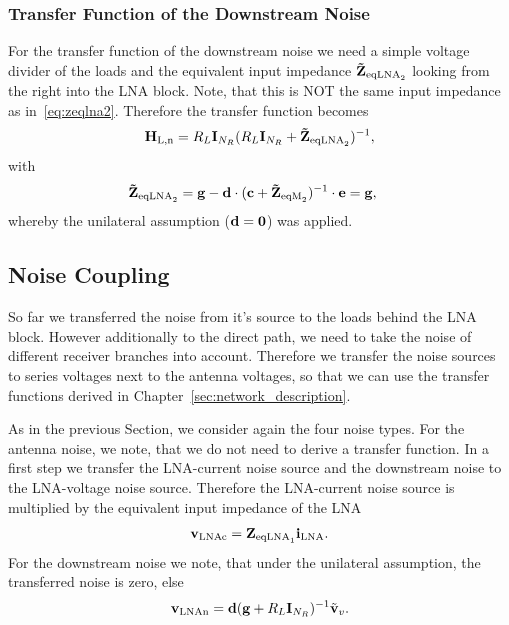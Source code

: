 \subsubsection{Transfer Function of the Downstream Noise}
\label{sec:down_noise_transf}
For the transfer function of the downstream noise we need a simple voltage divider of the loads and the equivalent input impedance $\mathbf{\tilde{Z}}_{\text{eqLNA}_2}$ looking from the right into the LNA block.
Note, that this is NOT the same input impedance as in~\eqref{eq:zeqlna2}.
Therefore the transfer function becomes
\begin{equation}
\mathbf{H}_\text{L,n} = R_L\mathbf{I}_{N_R}(R_L\mathbf{I}_{N_R} + \mathbf{\tilde{Z}}_{\text{eqLNA}_2})^{-1},
\end{equation}
with 
\begin{align}
\label{eq:zeqlna2_down}
\mathbf{\tilde{Z}}_{\text{eqLNA}_2} &= \mathbf{g} - \mathbf{d}\cdot(\mathbf{c} + \mathbf{\tilde{Z}}_{\text{eqM}_2})^{-1}\cdot\mathbf{e} = \mathbf{g},
\end{align}
whereby the unilateral assumption ($\mathbf{d}=\mathbf{0}$) was applied.


\subsection{Noise Coupling}
\label{sec:noise_coupling}

So far we transferred the noise from it's source to the loads behind the LNA block.
However additionally to the direct path, we need to take the noise of different receiver branches into account.
Therefore we transfer the noise sources to series voltages next to the antenna voltages, so that we can use the transfer functions derived in Chapter~\ref{sec:network_description}.

As in the previous Section, we consider again the four noise types.
For the antenna noise, we note, that we do not need to derive a transfer function.
In a first step we transfer the LNA-current noise source and the downstream noise to the LNA-voltage noise source.
Therefore the LNA-current noise source is multiplied by the equivalent input impedance of the LNA
\begin{align}
\mathbf{v}_\text{LNAc} = \mathbf{Z}_{\text{eqLNA}_1} \mathbf{i}_\text{LNA}.
\end{align}
For the downstream noise we note, that under the unilateral assumption, the transferred noise is zero, else
\begin{align}
\mathbf{v}_\text{LNAn} = \mathbf{d}(\mathbf{g}+R_L\mathbf{I}_{N_R})^{-1} \tilde{\mathbf{v}}_{v}.
\end{align}

